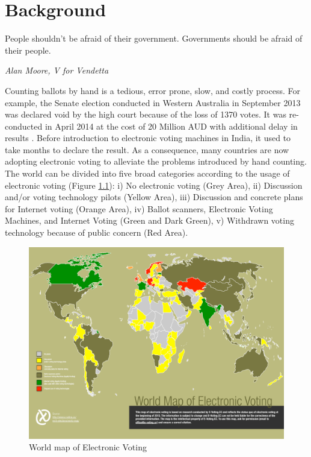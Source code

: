 \chapter{Background}
\label{cha:background}
\setlength{\parindent}{2em}
\setlength{\parskip}{1em}

\epigraph{People shouldn't be afraid of their government. Governments should be afraid of their people.} 
{\textit{Alan Moore, V for Vendetta }}
  Counting ballots by hand is a tedious, error prone, slow, and costly process. 
  For example, the Senate election conducted in Western Australia in September 2013 was 
  declared void by the high court because of the loss of 1370 votes. It was 
  re-conducted in April 2014 at the cost of 20 Million 
  AUD with additional  delay in results \citep{Aussentate}. Before introduction to 
  electronic voting machines in India, it used to take months to declare the result.
  As a consequence, many countries 
  are now adopting electronic voting to alleviate the problems introduced by hand counting. 
  The world can be divided into five broad categories according to 
  the usage of electronic voting \citep{Evoting} (Figure \ref{fig:world_electronic_voting_map}): i) No electronic 
  voting (Grey Area), ii)
  Discussion and/or voting technology pilots (Yellow Area), 
  iii) Discussion and concrete plans for Internet voting (Orange Area),
  iv) Ballot scanners, Electronic Voting Machines, and Internet Voting (Green and Dark Green),
  v) Withdrawn voting technology because of public concern (Red Area).
    \begin{figure}[!htb]
	\begin{center}
	\includegraphics[width=\textwidth,height=\textheight,keepaspectratio]{e-voting_worldmap_2015.pdf}
	\caption{World map of Electronic Voting}
	\label{fig:world_electronic_voting_map}
	\end{center}
  \end{figure}  
 
